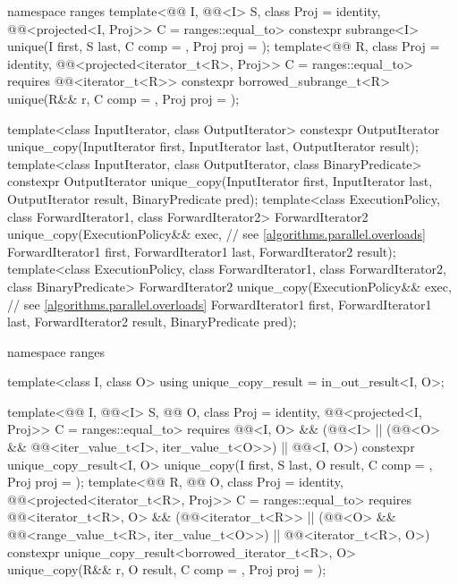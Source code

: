 \begin{codeblock}
{  namespace ranges {
    template<@@ I, @@<I> S, class Proj = identity,
             @@<projected<I, Proj>> C = ranges::equal_to>
      constexpr subrange<I> unique(I first, S last, C comp = {}, Proj proj = {});
    template<@@ R, class Proj = identity,
             @@<projected<iterator_t<R>, Proj>> C = ranges::equal_to>
      requires @@<iterator_t<R>>
      constexpr borrowed_subrange_t<R>
        unique(R&& r, C comp = {}, Proj proj = {});
  }

  template<class InputIterator, class OutputIterator>
    constexpr OutputIterator
      unique_copy(InputIterator first, InputIterator last,
                  OutputIterator result);
  template<class InputIterator, class OutputIterator, class BinaryPredicate>
    constexpr OutputIterator
      unique_copy(InputIterator first, InputIterator last,
                  OutputIterator result, BinaryPredicate pred);
  template<class ExecutionPolicy, class ForwardIterator1, class ForwardIterator2>
    ForwardIterator2
      unique_copy(ExecutionPolicy&& exec,                       // see \ref{algorithms.parallel.overloads}
                  ForwardIterator1 first, ForwardIterator1 last,
                  ForwardIterator2 result);
  template<class ExecutionPolicy, class ForwardIterator1, class ForwardIterator2,
           class BinaryPredicate>
    ForwardIterator2
      unique_copy(ExecutionPolicy&& exec,                       // see \ref{algorithms.parallel.overloads}
                  ForwardIterator1 first, ForwardIterator1 last,
                  ForwardIterator2 result, BinaryPredicate pred);

  namespace ranges {
    template<class I, class O>
      using unique_copy_result = in_out_result<I, O>;

    template<@@ I, @@<I> S, @@ O, class Proj = identity,
             @@<projected<I, Proj>> C = ranges::equal_to>
      requires @@<I, O> &&
               (@@<I> ||
                (@@<O> && @@<iter_value_t<I>, iter_value_t<O>>) ||
                @@<I, O>)
      constexpr unique_copy_result<I, O>
        unique_copy(I first, S last, O result, C comp = {}, Proj proj = {});
    template<@@ R, @@ O, class Proj = identity,
             @@<projected<iterator_t<R>, Proj>> C = ranges::equal_to>
      requires @@<iterator_t<R>, O> &&
               (@@<iterator_t<R>> ||
                (@@<O> && @@<range_value_t<R>, iter_value_t<O>>) ||
                @@<iterator_t<R>, O>)
      constexpr unique_copy_result<borrowed_iterator_t<R>, O>
        unique_copy(R&& r, O result, C comp = {}, Proj proj = {});
  }

}
\end{codeblock}
